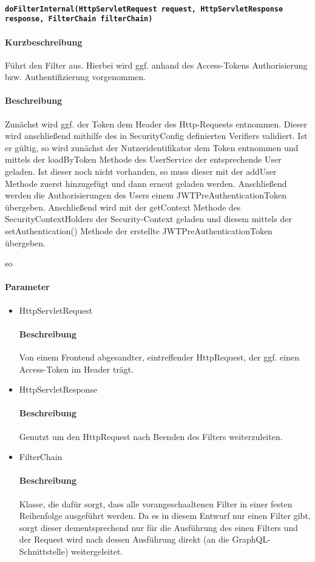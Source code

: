 \paragraph{\texttt{doFilterInternal(HttpServletRequest request, HttpServletResponse response, FilterChain filterChain)}}%
\paragraph*{Kurzbeschreibung}
Führt den Filter aus. Hierbei wird ggf. anhand des Access-Tokens Authorisierung bzw. Authentifizierung vorgenommen.
\paragraph*{Beschreibung}
Zunächst wird ggf. der Token dem Header des Http-Requests entnommen. Dieser wird anschließend mithilfe des in
\dq SecurityConfig\dq{} definierten Verifiers validiert. Ist er gültig, so wird zunächst der Nutzeridentifikator dem Token entnommen und mittels der \dq loadByToken \dq Methode 
des UserService der entsprechende User geladen. Ist dieser noch nicht vorhanden, so muss dieser mit der \dq addUser\dq{} Methode
zuerst hinzugefügt und dann erneut geladen werden. Anschließend werden die Authorisierungen des Users einem \dq 
JWTPreAuthenticationToken \dq übergeben. Anschließend wird mit der \dq getContext\dq{} Methode des SecurityContextHolders der 
Security-Context geladen und diesem mittels der \dq setAuthentication()\dq{} Methode der erstellte JWTPreAuthenticationToken 
übergeben. 

so
\paragraph*{Parameter}
\begin{itemize}
    \item HttpServletRequest
    		\paragraph*{Beschreibung}
            Von einem Frontend abgesandter, eintreffender HttpRequest, der ggf. einen Access-Token im Header trägt.
    \item HttpServletResponse
        	\paragraph*{Beschreibung}
            Genutzt um den HttpRequest nach Beenden des Filters weiterzuleiten.
    \item FilterChain
    		\paragraph*{Beschreibung}
            Klasse, die dafür sorgt, dass alle vorangeschaaltenen Filter in einer festen Reihenfolge ausgeführt werden. Da es in diesem Entwurf nur einen Filter gibt,
            sorgt dieser dementsprechend nur für die Ausführung des einen Filters und der Request wird nach dessen Ausführung direkt (an die GraphQL-Schnittstelle) weitergeleitet.

\end{itemize}